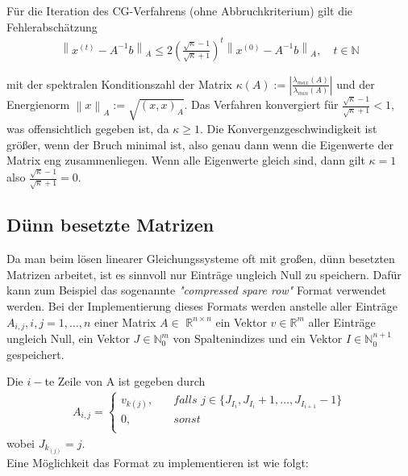 \documentclass[12pt,a4paper]{scrartcl}
\numberwithin{equation}{section}
\numberwithin{myalgctr}{section}
\numberwithin{mytheoremctr}{subsection}
\numberwithin{mykorollarctr}{subsection}
\numberwithin{mylemmactr}{subsection}
\numberwithin{mybeispielctr}{subsection}
\newcommand\norm[1]{\left\lVert#1\right\rVert}
\begin{document}
	
	Für die Iteration des CG-Verfahrens (ohne Abbruchkriterium) gilt die Fehlerabschätzung \autocite[vgl.][102]{skript}
	\begin{align*}
		\norm{x^{(t)} - A^{-1}b}_A \leq 2\left(\frac{\sqrt{\kappa} - 1}{\sqrt{\kappa} + 1}\right)^{t}\norm{x^{(0)} - A^{-1}b}_A, \quad t\in\mathbb{N}
	\end{align*}
	
	mit der spektralen Konditionszahl der Matrix $\kappa(A) := \left|\frac{\lambda_{max}(A)}{\lambda_{min}(A)}\right|$ und der Energienorm $\norm{x}_A := \sqrt{(x,x)_A}$. Das Verfahren konvergiert für $\frac{\sqrt{\kappa} - 1}{\sqrt{\kappa} + 1} < 1$, was offensichtlich gegeben ist, da $\kappa \geq 1$. Die Konvergenzgeschwindigkeit ist größer, wenn der Bruch minimal ist, also genau dann wenn die Eigenwerte der Matrix eng zusammenliegen. Wenn alle Eigenwerte gleich sind, dann gilt $\kappa = 1$ also $\frac{\sqrt{\kappa} - 1}{\sqrt{\kappa} + 1} = 0$. 
	
	\subsection{Dünn besetzte Matrizen}
	
	Da man beim lösen linearer Gleichungssysteme oft mit großen, dünn besetzten Matrizen arbeitet, ist es sinnvoll nur Einträge ungleich Null zu speichern. Dafür kann zum Beispiel das sogenannte \textit{"compressed spare row"} Format verwendet werden. Bei der Implementierung dieses Formats werden anstelle aller Einträge $A_{i,j}, i,j = 1,\ldots,n$ einer Matrix $A\in$ $\mathbb{R}^{n\times n}$ ein Vektor $v\in\mathbb{R}^{m}$ aller Einträge ungleich Null, ein Vektor $J\in\mathbb{N}_0^{m}$ von Spaltenindizes und ein Vektor $I\in\mathbb{N}_0^{n+1}$ gespeichert.
	
	Die $i-$te Zeile von A ist gegeben durch
	\begin{align*}
		A_{i,j} = 
		\begin{cases}
			\textit{$v_{k(j)}$},&\quad\textit{falls $j \in \{J_{I_i}, J_{I_{i}} + 1, \ldots, J_{I_{i+1}} - 1$}\}\\
			\textit{0},&\quad\textit{sonst}\\
		\end{cases}
	\end{align*} 
	wobei $J_{k_{(j)}} = j$.\\
	
	Eine Möglichkeit das Format zu implementieren ist wie folgt:
	
	 
	
\end{document}
